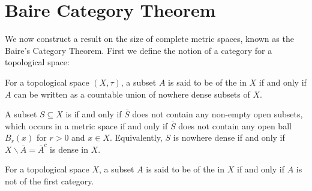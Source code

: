\section{Baire Category Theorem}

We now construct a result on the size of complete metric spaces, known as the Baire's Category Theorem. First we define the notion of a category for a topological space:

\begin{defn}
    For a topological space $(X,\tau)$, a subset $A$ is said to be of the  in $X$ if and only if $A$ can be written as a countable union of nowhere dense subsets of $X$.
\end{defn}

\begin{defn}
    A subset $S \subseteq X$ is  if and only if $\overline{S}$ does not contain any non-empty open subsets, which occurs in a metric space if and only if $\overline{S}$ does not contain any open ball $B_r(x)$ for $r > 0$ and $x \in X$. Equivalently, $S$ is nowhere dense if and only if $X\backslash\overline{A} = \overline{A}^c$ is dense in $X$.
\end{defn}

\begin{defn}
    For a topological space $X$, a subset $A$ is said to be of the  in $X$ if and only if $A$ is not of the first category.
\end{defn}

